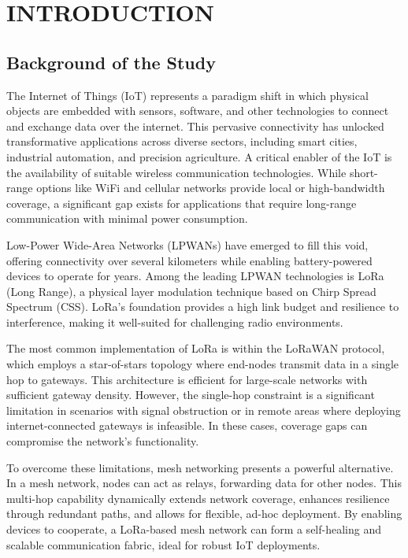 \setlength{\parindent}{0in}
\setlength{\parskip}{0mm}
\setlength{\baselineskip}{1.6em}

\chapter{INTRODUCTION}
\label{chap:introduction}

\section{Background of the Study}
\label{sec:background}

The Internet of Things (IoT) represents a paradigm shift in which physical objects are embedded with sensors, software, and other technologies to connect and exchange data over the internet. This pervasive connectivity has unlocked transformative applications across diverse sectors, including smart cities, industrial automation, and precision agriculture. A critical enabler of the IoT is the availability of suitable wireless communication technologies. While short-range options like WiFi and cellular networks provide local or high-bandwidth coverage, a significant gap exists for applications that require long-range communication with minimal power consumption.

Low-Power Wide-Area Networks (LPWANs) have emerged to fill this void, offering connectivity over several kilometers while enabling battery-powered devices to operate for years. Among the leading LPWAN technologies is LoRa (Long Range), a physical layer modulation technique based on Chirp Spread Spectrum (CSS). LoRa's foundation provides a high link budget and resilience to interference, making it well-suited for challenging radio environments.

The most common implementation of LoRa is within the LoRaWAN protocol, which employs a star-of-stars topology where end-nodes transmit data in a single hop to gateways. This architecture is efficient for large-scale networks with sufficient gateway density. However, the single-hop constraint is a significant limitation in scenarios with signal obstruction or in remote areas where deploying internet-connected gateways is infeasible. In these cases, coverage gaps can compromise the network's functionality.

To overcome these limitations, mesh networking presents a powerful alternative. In a mesh network, nodes can act as relays, forwarding data for other nodes. This multi-hop capability dynamically extends network coverage, enhances resilience through redundant paths, and allows for flexible, ad-hoc deployment. By enabling devices to cooperate, a LoRa-based mesh network can form a self-healing and scalable communication fabric, ideal for robust IoT deployments.

